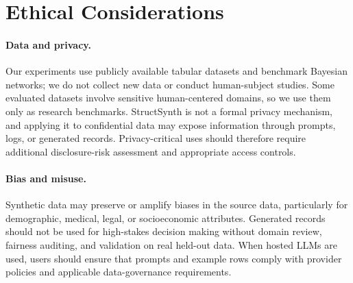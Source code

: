 \section*{Ethical Considerations}

\paragraph{Data and privacy.}
Our experiments use publicly available tabular datasets and benchmark Bayesian networks; we do not collect new data or conduct human-subject studies.
Some evaluated datasets involve sensitive human-centered domains, so we use them only as research benchmarks.
\textsf{StructSynth} is not a formal privacy mechanism, and applying it to confidential data may expose information through prompts, logs, or generated records.
Privacy-critical uses should therefore require additional disclosure-risk assessment and appropriate access controls.

\paragraph{Bias and misuse.}
Synthetic data may preserve or amplify biases in the source data, particularly for demographic, medical, legal, or socioeconomic attributes.
Generated records should not be used for high-stakes decision making without domain review, fairness auditing, and validation on real held-out data.
When hosted LLMs are used, users should ensure that prompts and example rows comply with provider policies and applicable data-governance requirements.

